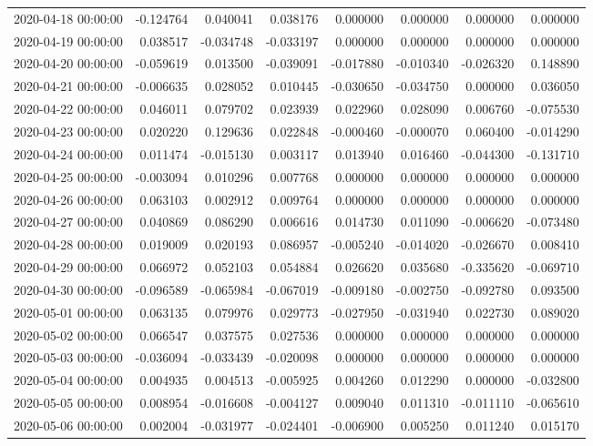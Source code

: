 \begin{tabular}{lrrrrrrr}
2020-04-18 00:00:00 & -0.124764 & 0.040041 & 0.038176 & 0.000000 & 0.000000 & 0.000000 & 0.000000 \\
2020-04-19 00:00:00 & 0.038517 & -0.034748 & -0.033197 & 0.000000 & 0.000000 & 0.000000 & 0.000000 \\
2020-04-20 00:00:00 & -0.059619 & 0.013500 & -0.039091 & -0.017880 & -0.010340 & -0.026320 & 0.148890 \\
2020-04-21 00:00:00 & -0.006635 & 0.028052 & 0.010445 & -0.030650 & -0.034750 & 0.000000 & 0.036050 \\
2020-04-22 00:00:00 & 0.046011 & 0.079702 & 0.023939 & 0.022960 & 0.028090 & 0.006760 & -0.075530 \\
2020-04-23 00:00:00 & 0.020220 & 0.129636 & 0.022848 & -0.000460 & -0.000070 & 0.060400 & -0.014290 \\
2020-04-24 00:00:00 & 0.011474 & -0.015130 & 0.003117 & 0.013940 & 0.016460 & -0.044300 & -0.131710 \\
2020-04-25 00:00:00 & -0.003094 & 0.010296 & 0.007768 & 0.000000 & 0.000000 & 0.000000 & 0.000000 \\
2020-04-26 00:00:00 & 0.063103 & 0.002912 & 0.009764 & 0.000000 & 0.000000 & 0.000000 & 0.000000 \\
2020-04-27 00:00:00 & 0.040869 & 0.086290 & 0.006616 & 0.014730 & 0.011090 & -0.006620 & -0.073480 \\
2020-04-28 00:00:00 & 0.019009 & 0.020193 & 0.086957 & -0.005240 & -0.014020 & -0.026670 & 0.008410 \\
2020-04-29 00:00:00 & 0.066972 & 0.052103 & 0.054884 & 0.026620 & 0.035680 & -0.335620 & -0.069710 \\
2020-04-30 00:00:00 & -0.096589 & -0.065984 & -0.067019 & -0.009180 & -0.002750 & -0.092780 & 0.093500 \\
2020-05-01 00:00:00 & 0.063135 & 0.079976 & 0.029773 & -0.027950 & -0.031940 & 0.022730 & 0.089020 \\
2020-05-02 00:00:00 & 0.066547 & 0.037575 & 0.027536 & 0.000000 & 0.000000 & 0.000000 & 0.000000 \\
2020-05-03 00:00:00 & -0.036094 & -0.033439 & -0.020098 & 0.000000 & 0.000000 & 0.000000 & 0.000000 \\
2020-05-04 00:00:00 & 0.004935 & 0.004513 & -0.005925 & 0.004260 & 0.012290 & 0.000000 & -0.032800 \\
2020-05-05 00:00:00 & 0.008954 & -0.016608 & -0.004127 & 0.009040 & 0.011310 & -0.011110 & -0.065610 \\
2020-05-06 00:00:00 & 0.002004 & -0.031977 & -0.024401 & -0.006900 & 0.005250 & 0.011240 & 0.015170 \\

\end{tabular}
